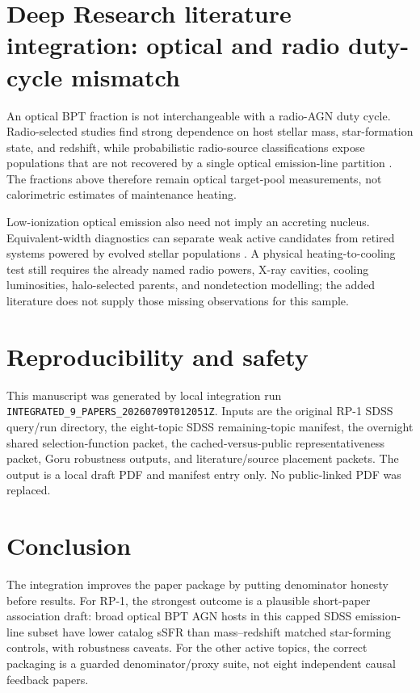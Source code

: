 \documentclass[twocolumn]{aastex702}
\begin{document}
\section{Deep Research literature integration: optical and radio duty-cycle mismatch}\label{sec:dr-r1}
An optical BPT fraction is not interchangeable with a radio-AGN duty cycle. Radio-selected studies find strong dependence on host stellar mass, star-formation state, and redshift, while probabilistic radio-source classifications expose populations that are not recovered by a single optical emission-line partition \citep{kondapally2025,drake2024}. The fractions above therefore remain optical target-pool measurements, not calorimetric estimates of maintenance heating.

Low-ionization optical emission also need not imply an accreting nucleus. Equivalent-width diagnostics can separate weak active candidates from retired systems powered by evolved stellar populations \citep{cidfernandes2011}. A physical heating-to-cooling test still requires the already named radio powers, X-ray cavities, cooling luminosities, halo-selected parents, and nondetection modelling; the added literature does not supply those missing observations for this sample.

\section{Reproducibility and safety}\label{sec:repro}
This manuscript was generated by local integration run \texttt{INTEGRATED\_9\_PAPERS\_20260709T012051Z}. Inputs are the original RP-1 SDSS query/run directory, the eight-topic SDSS remaining-topic manifest, the overnight shared selection-function packet, the cached-versus-public representativeness packet, Goru robustness outputs, and literature/source placement packets. The output is a local draft PDF and manifest entry only. No public-linked PDF was replaced.

\section{Conclusion}\label{sec:conclusion}
The integration improves the paper package by putting denominator honesty before results. For RP-1, the strongest outcome is a plausible short-paper association draft: broad optical BPT AGN hosts in this capped SDSS emission-line subset have lower catalog sSFR than mass--redshift matched star-forming controls, with robustness caveats. For the other active topics, the correct packaging is a guarded denominator/proxy suite, not eight independent causal feedback papers.
\end{document}
